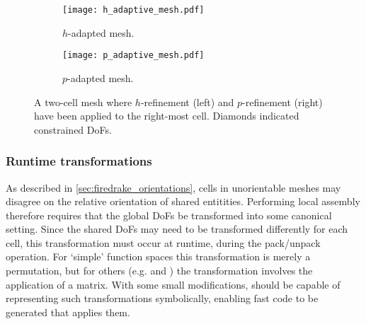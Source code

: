 \documentclass[thesis]{subfiles}
\begin{document}
\begin{description}
\end{description}

\begin{figure}
  \centering
  \begin{subfigure}{.49\textwidth}
    \centering
    \texttt{[image: h\_adaptive\_mesh.pdf]}
    \caption{$h$-adapted mesh.}
    \label{fig:h_adaptive_mesh}
  \end{subfigure}
  \begin{subfigure}{.49\textwidth}
    \centering
    \texttt{[image: p\_adaptive\_mesh.pdf]}
    \caption{$p$-adapted mesh.}
  \end{subfigure}

  \caption{
    A two-cell mesh where $h$-refinement (left) and $p$-refinement (right) have been applied to the right-most cell.
    Diamonds indicated constrained DoFs.
  }
  \label{fig:adaptive_mesh}
\end{figure}

\subsubsection{Runtime transformations}

As described in \cref{sec:firedrake_orientations}, cells in unorientable meshes may disagree on the relative orientation of shared entitities.
Performing local assembly therefore requires that the global DoFs be transformed into some canonical setting.
Since the shared DoFs may need to be transformed differently for each cell, this transformation must occur at runtime, during the pack/unpack operation.
For `simple' function spaces this transformation is merely a permutation, but for others (e.g. \hdiv and \hcurl) the transformation involves the application of a matrix.
With some small modifications,  should be capable of representing such transformations symbolically, enabling fast code to be generated that applies them.
\end{document}
